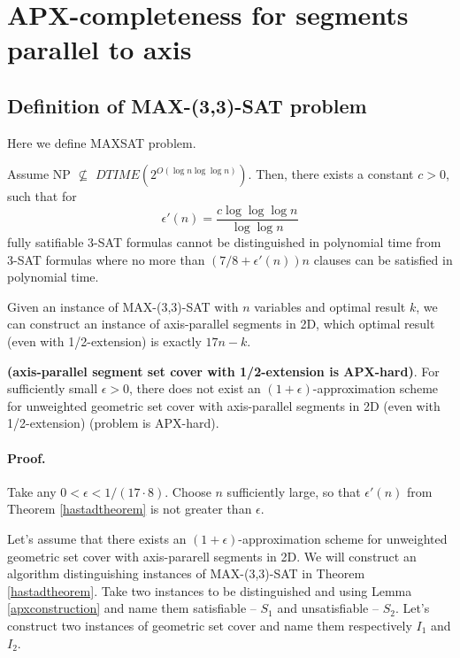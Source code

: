\section{APX-completeness for segments parallel to axis}
\label{section:segment_apx}

\subsection{Definition of  MAX-(3,3)-SAT problem}
Here we define MAXSAT problem.

\begin{tw}{
	\label{hastadtheorem}
	\textbf{\cite{hastad}}
	Assume NP $\not\subseteq$ $DTIME(2^{O(\log n \log \log n)})$.
	Then, there exists a constant $c > 0$, such that for
	$$\epsilon'(n) = \frac{c \log \log \log n}{\log \log n}$$ 
	fully satifiable 3-SAT formulas cannot be distinguished 
	in polynomial time from
	3-SAT formulas where no more than $(7/8+\epsilon'(n))n$ clauses
	can be satisfied in polynomial time.
}\end{tw}

\begin{lemma}{
	\label{apxconstruction}
	Given an instance of  MAX-(3,3)-SAT 
	with $n$ variables and optimal result $k$,
	we can construct an instance of axis-parallel segments in 2D,
	which optimal result (even with 1/2-extension) is exactly $17n - k$.
}\end{lemma}

\begin{tw}{
	\textbf{(axis-parallel segment set cover with 1/2-extension is APX-hard)}.	
	For sufficiently small $\epsilon > 0$,
	there does not exist an $(1+\epsilon)$-approximation scheme
	for unweighted geometric set cover
	with axis-parallel segments in 2D (even with 1/2-extension)
	(problem is APX-hard).
}\end{tw}

\paragraph{Proof.}
Take any $0 < \epsilon < 1/(17 \cdot 8)$.
Choose $n$ sufficiently large, so that $\epsilon'(n)$ from
Theorem \ref{hastadtheorem}
is not greater than $\epsilon$.

Let's assume that there exists an $(1+\epsilon)$-approximation scheme
for unweighted geometric set cover with axis-pararell segments in 2D.
We will construct an algorithm distinguishing instances of
MAX-(3,3)-SAT
in Theorem \ref{hastadtheorem}.
Take two instances to be distinguished and using
Lemma \ref{apxconstruction}
and name them satisfiable -- $S_1$ and unsatisfiable -- $S_2$.
Let's construct two instances of geometric set cover
and name them respectively $I_1$ and $I_2$.

